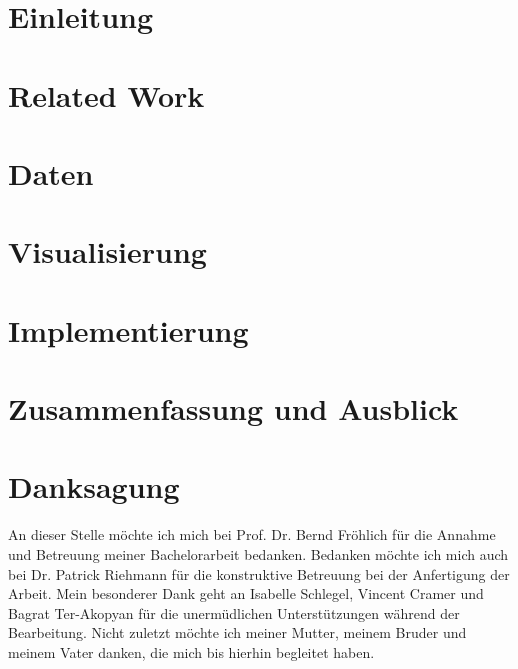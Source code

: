 \chapter{Einleitung}
\label{chap:einleitung}


\chapter{Related Work}
\label{chap:related_work}


\chapter{Daten}
\label{chap:daten}


\chapter{Visualisierung}
\label{chap:visualization}


\chapter{Implementierung}
\label{chap:Implementierung}


\chapter{Zusammenfassung und Ausblick}
\label{chap:Zusammenfassung}


\cleardoublepage
\clearpage



\newpage
\let\cleardoublepage\clearpage
\chapter*{Danksagung}
An dieser Stelle möchte ich mich bei Prof. Dr. Bernd Fröhlich für die Annahme und Betreuung meiner Bachelorarbeit bedanken.
Bedanken möchte ich mich auch bei Dr. Patrick Riehmann für die konstruktive Betreuung bei der Anfertigung der Arbeit.
Mein besonderer Dank geht an Isabelle Schlegel, Vincent Cramer und Bagrat Ter-Akopyan für die unermüdlichen Unterstützungen während der Bearbeitung.
Nicht zuletzt möchte ich meiner Mutter, meinem Bruder und meinem Vater danken, die mich bis hierhin begleitet haben.



